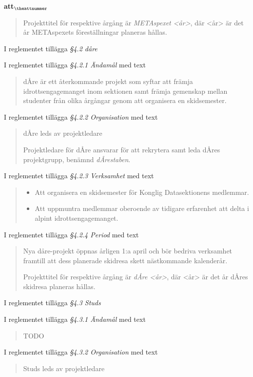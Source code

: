 \documentclass[a4paper]{article}
\begin{document}
\begin{list}{\bf att$_{\theattnummer}$}{}
\begin{quote}
    Projekttitel för respektive årgång är \textit{METAspexet <år>}, där <år> är det år METAspexets föreställningar planeras hållas.
    \end{quote}


\item I reglementet tillägga \textit{\S4.2 dåre}
\item I reglementet tillägga \textit{\S4.2.1 Ändamål} med text
    \begin{quote}
        dÅre är ett återkommande projekt som syftar att främja idrottsengagemanget inom sektionen samt främja gemenskap mellan studenter från olika årgångar genom att organisera en skidsemester.
    \end{quote}
\item I reglementet tillägga \textit{\S4.2.2 Organisation} med text
    \begin{quote}
        dÅre leds av projektledare

        Projektledare för dÅre ansvarar för att rekrytera samt leda dÅres projektgrupp, benämnd \textit{dÅrestaben}.
    \end{quote}
\item I reglementet tillägga \textit{\S4.2.3 Verksamhet} med text
    \begin{quote}
        \begin{itemize}
            \item Att organisera en skidsemester för Konglig Datasektionens medlemmar.
            \item Att uppmuntra medlemmar oberoende av tidigare erfarenhet att delta i alpint idrottsengagemanget.
        \end{itemize}
    \end{quote}
\item I reglementet tillägga \textit{\S4.2.4 Period} med text
    \begin{quote}
        Nya dåre-projekt öppnas årligen 1:a april och bör bedriva verksamhet framtill att dess planerade skidresa skett nästkommande kalenderår.

        Projekttitel för respektive årgång är \textit{dÅre <år>}, där <år> är det år dÅres skidresa planeras hållas.
    \end{quote}


\item I reglementet tillägga \textit{\S4.3 Studs}
\item I reglementet tillägga \textit{\S4.3.1 Ändamål} med text
    \begin{quote}
        TODO
    \end{quote}
\item I reglementet tillägga \textit{\S4.3.2 Organisation} med text
    \begin{quote}
        Studs leds av projektledare


\end{quote}
\end{list}
\end{document}
